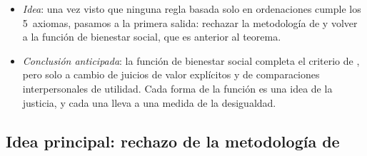 \documentclass[11pt]{article}
\begin{document}
\begin{itemize}
\item \emph{Idea}: una vez visto que ninguna regla basada solo en ordenaciones cumple los 5~axiomas, pasamos a la primera salida: rechazar la metodología de  y volver a la función de bienestar social, que es anterior al teorema.
\item \emph{Conclusión anticipada}: la función de bienestar social completa el criterio de , pero solo a cambio de juicios de valor explícitos y de comparaciones interpersonales de utilidad. Cada forma de la función es una idea de la justicia, y cada una lleva a una medida de la desigualdad.
\end{itemize}

\subsection{Idea principal: rechazo de la metodología de }\label{sec:rechazo-metodologia}
\end{document}

